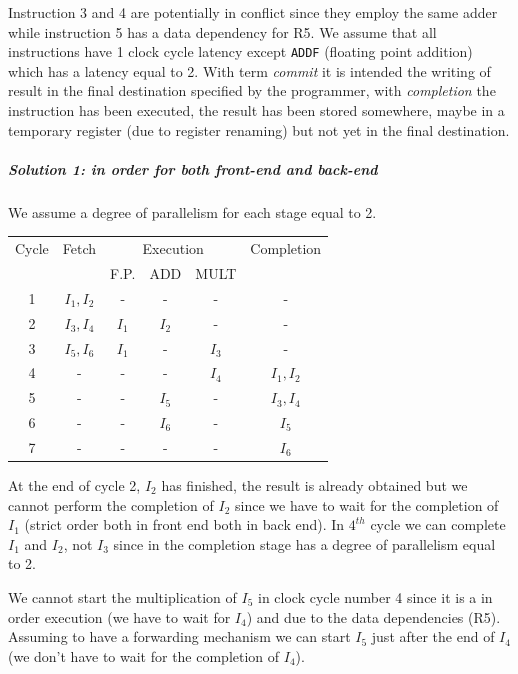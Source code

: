 Instruction 3 and 4 are potentially in conflict since they employ the same adder while instruction 5 has a data dependency for R5. We assume that all instructions have 1 clock cycle latency except \verb|ADDF| (floating point addition) which has a latency equal to 2.
With term \textit{commit} it is intended the writing of result in the final destination specified by the programmer, with \textit{completion} the instruction has been executed, the result has been stored somewhere, maybe in a temporary register (due to register renaming) but not yet in the final destination.

\subparagraph{Solution 1: in order for both front-end and back-end}
We assume a degree of parallelism for each stage equal to 2.

\begin{center}
  \begin{tabular}{|c|c|c|c|c|c|}
    \hline
    Cycle&    Fetch       &\multicolumn{3}{|c|}{Execution}  &   Completion  \\
    &       &     F.P.  & ADD     & MULT  &               \\ \hline \hline
    1&    $I_1, I_2$&       -&    -&    -&        -\\
    2&    $I_3, I_4$&       $I_1$&  $I_2$&  -&        -\\
    3&    $I_5, I_6$&       $I_1$&  -&    $I_3$&      -\\
    4&      -&          -&    -&    $I_4$&      $I_1,I_2$\\
    5&      -&          -&    $I_5$&    -&      $I_3,I_4$\\
    6&      -&          -&    $I_6$&    -&      $I_5$\\
    7&      -&          -&    -&      -&      $I_6$\\
    \hline
  \end{tabular}
\end{center}

At the end of cycle 2, $I_2$ has finished, the result is already obtained but we cannot perform the completion of $I_2$ since we have to wait for the completion of $I_1$ (strict order both in front end both in back end). In $4^{th}$ cycle we can complete $I_1$ and $I_2$, not $I_3$ since in the completion stage has a degree of parallelism equal to 2.

We cannot start the multiplication of $I_5$ in clock cycle number 4 since it is a in order execution (we have to wait for $I_4$) and due to the data dependencies (R5). Assuming to have a forwarding mechanism we can start $I_5$ just after the end of $I_4$ (we don't have to wait for the completion of $I_4$).

